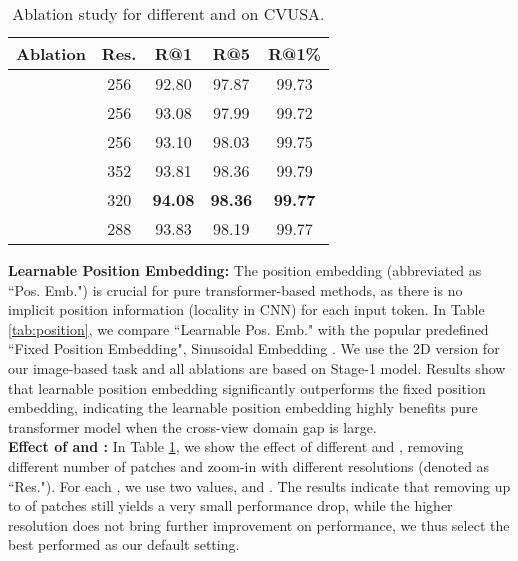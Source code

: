 \documentclass[10pt,twocolumn,letterpaper]{article}
\begin{document}
\begin{table}[!htbp]
    \centering
    \begin{tabular}{l c c c c} 
    \hline
    
    \hline
    Ablation & Res. & R@1 & R@5 & R@1\% \\
    \hline
         & 256 & 92.80 & 97.87 & 99.73\\
         & 256 & 93.08 & 97.99  & 99.72  \\
         & 256 & 93.10 & 98.03& 99.75 \\
        \hline
         & 352 & 93.81 & 98.36 & 99.79 \\
         & 320 & \textbf{94.08} & \textbf{98.36}  & \textbf{99.77} \\
         & 288 & 93.83 & 98.19 & 99.77 \\
    \hline
    
    \hline
    \end{tabular}
\caption{Ablation study for different  and  on CVUSA.}
    \label{tab:beta}
    \vspace{-0.2cm}
\end{table}

\noindent\textbf{Learnable Position Embedding:} The position embedding (abbreviated as ``Pos. Emb.") is crucial for pure transformer-based methods, as there is no implicit position information (\eg locality in CNN) for each input token. In Table \ref{tab:position}, we compare ``Learnable Pos. Emb." with the popular predefined ``Fixed Position Embedding", \ie Sinusoidal Embedding \cite{transformer}. We use the 2D version \cite{vit} for our image-based task and all ablations are based on Stage-1 model. Results show that learnable position embedding significantly outperforms the fixed position embedding, indicating the learnable position embedding highly benefits pure transformer model when the cross-view domain gap is large. \\
\noindent\textbf{Effect of  and :} In Table \ref{tab:beta}, we show the effect of different  and , removing different number of patches and zoom-in with different resolutions (denoted as ``Res."). For each , we use two  values, \ie  and . The results indicate that removing up to  of patches still yields a very small performance drop, while the higher resolution does not bring further improvement on performance, we thus select the best performed  as our default setting.\\
\end{document}
